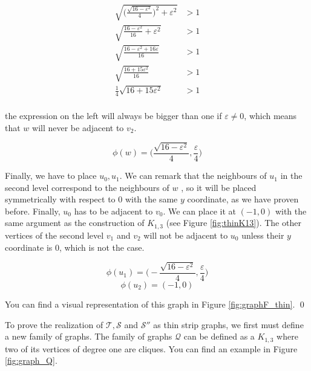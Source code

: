{\begin{equation*}
  \begin{split}
    \sqrt{\Bigg(\frac{\sqrt{16 - \varepsilon^2}}{4}\Bigg)^2 + \varepsilon^2} &> 1\\
    \sqrt{\frac{16 - \varepsilon^2}{16} + \varepsilon^2} &> 1\\
    \sqrt{\frac{16 - \varepsilon^2 + 16\varepsilon}{16}} &> 1\\
    \sqrt{\frac{16 + 15\varepsilon^2}{16}} &> 1\\
    \frac{1}{4}\sqrt{16 + 15\varepsilon^2} &> 1\\
  \end{split}
\end{equation*}

the expression on the left will always be bigger than one if $\varepsilon \neq 0$, which means that $w$ will never be adjacent to $v_2$.

$$\phi(w) = \Bigg(\frac{\sqrt{16 - \varepsilon^2}}{4}, \frac{\varepsilon}{4}\Bigg)$$

Finally, we have to place $u_0, u_1$. We can remark that the neighbours of $u_1$ in the second level correspond to the neighbours of $w$ , so it will be placed symmetrically with respect to 0 with the same $y$ coordinate, as we have proven before. Finally, $u_0$ has to be adjacent to $v_0$. We can place it at $(-1,0)$ with the same argument as the construction of $K_{1,3}$ (see Figure \ref{fig:thinK13}). The other vertices of the second level $v_1$ and $v_2$ will not be adjacent to $u_0$ unless their $y$ coordinate is 0, which is not the case.

$$\phi(u_1) = \Bigg(-\frac{\sqrt{16 - \varepsilon^2}}{4}, \frac{\varepsilon}{4}\Bigg)$$
$$\phi(u_2) = (-1, 0)$$

You can find a visual representation of this graph in Figure \ref{fig:graphF_thin}. \qed
}


To prove the realization of $\mathcal{T}, \mathcal{S}$ and $\mathcal{S''}$ as thin strip graphs, we first must define a new family of graphs. The family of graphs $\mathcal{Q}$ can be defined as a $K_{1,3}$ where two of its vertices of degree one are cliques. You can find an example in Figure \ref{fig:graph_Q}.


